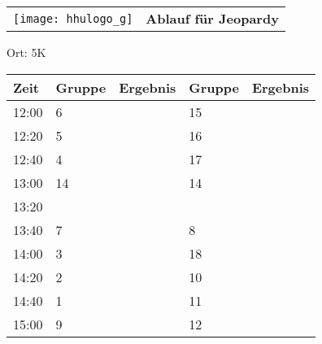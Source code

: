 \documentclass[a4paper,10pt]{article}
\def\spielf{Jeopardy}
\def\raumf{5K}
\begin{document}
  \begin{tabularx}{\textwidth}{lc}
    \texttt{[image: hhulogo\_g]}
  & {\Huge \textbf{Ablauf für \spielf}}
  \end{tabularx}
  \LARGE
  \begin{center}
    \vspace{1cm} 
    Ort: \raumf
  \end{center}
    \vspace{2cm} 
    \begin{tabularx}{\textwidth}{X||X|X||X|X}
	\textbf{Zeit} &\textbf{Gruppe} & \textbf{Ergebnis} &\textbf{Gruppe} & \textbf{Ergebnis}  	\\ \hline \hline
	12:00 &	6	&	&15	&	\\ \hline
	12:20 &	5	&	&16	&	\\ \hline
	12:40 &	4	&	&17	&	\\ \hline

	13:00 &	14	&	&14	&	\\ \hline
	13:20 &		&	&	&	\\ \hline
	13:40 &	7	&	&8	&	\\ \hline

	14:00 &	3	&	&18	&	\\ \hline
	14:20 &	2	&	&10	&	\\ \hline
	14:40 &	1	&	&11	&	\\ \hline

	15:00 &	9	&	&12	&	\\ \hline
      
    \end{tabularx}
   
   \newpage
\end{document}
